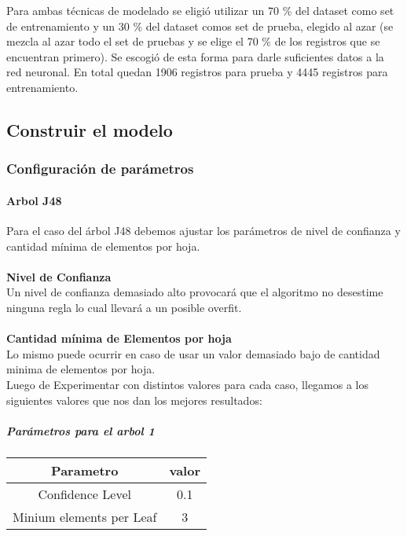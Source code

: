       Para ambas técnicas de modelado se eligió utilizar un 70 \% del dataset
      como set de entrenamiento y un 30 \% del dataset comos set de prueba,
      elegido al azar (se mezcla al azar todo el set de pruebas y se elige el
      70 \% de los registros que se encuentran primero). Se escogió de esta forma
      para darle suficientes datos a la red neuronal. En total quedan 1906
      registros para prueba y 4445 registros para entrenamiento.


\subsection{Construir el modelo}
    \subsubsection{Configuración de parámetros}

      \paragraph{Arbol J48}
          Para el caso del árbol J48 debemos ajustar los parámetros de nivel de
          confianza y cantidad mínima de elementos por hoja.\\\\
          \textbf{Nivel de Confianza\\}
          Un nivel de confianza demasiado alto provocará que el algoritmo no
          desestime ninguna regla lo cual llevará a un posible overfit.\\\\
          \textbf{Cantidad mínima de Elementos por hoja\\}
          Lo mismo puede ocurrir en caso de usar un valor demasiado bajo de
          cantidad minima de elementos por hoja.\\
          Luego de Experimentar con distintos valores para cada caso, llegamos a
          los siguientes valores que nos dan los mejores resultados:

          \subparagraph{Parámetros para el arbol 1}

            \begin{tabular}{||c | c||}
                \hline
                \textbf{Parametro} & \textbf{valor} \\ [0.5ex]
                \hline\hline
                Confidence Level & 0.1 \\
                \hline
                Minium elements per Leaf & 3 \\
                \hline
            \end{tabular}

